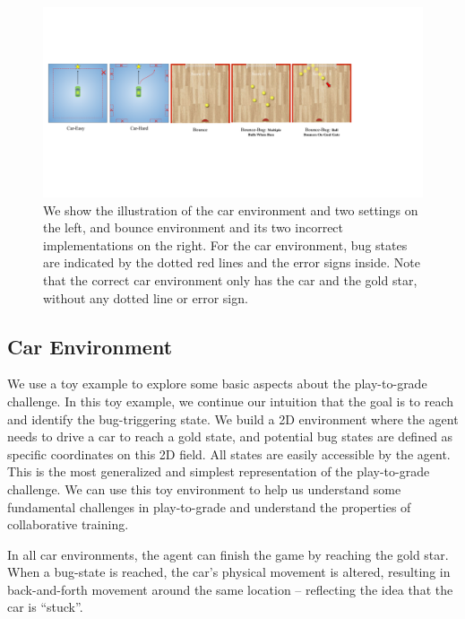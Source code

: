 \documentclass{article}
\newcommand{\EDIT}[1]{#1}%
\begin{document}
\begin{figure}[t!]
  \centering
  \includegraphics[width=\linewidth]{images/car_bounce.pdf}
  \caption{We show the illustration of the car environment and two settings on the left, and bounce environment and its two incorrect implementations on the right. For the car environment, bug states are indicated by the dotted red lines and the error signs inside. Note that the correct car environment only has the car and the gold star, without any dotted line or error sign. }
  \label{fig:car-bounce}
\end{figure}





\subsection{Car Environment}
\vspace{-2mm} 

We use a toy example to \EDIT{explore some basic aspects about the play-to-grade challenge}. In this toy example, we continue our intuition that the goal is to reach and \EDIT{identify} the bug-triggering state. \EDIT{We build a 2D environment where the agent needs to drive a car to reach a gold  state, and potential bug states are defined as specific coordinates on this 2D field. All states are easily accessible by the agent. This is the most generalized and simplest representation of the play-to-grade challenge. We can use this toy environment to help us understand some fundamental challenges in play-to-grade and understand the properties of collaborative training.}



In all car environments, the agent can finish the game by reaching the gold star. 
When a bug-state is reached, the car's physical movement is altered, resulting in back-and-forth movement around the same location -- reflecting the idea that the car is ``stuck''. 
\end{document}
